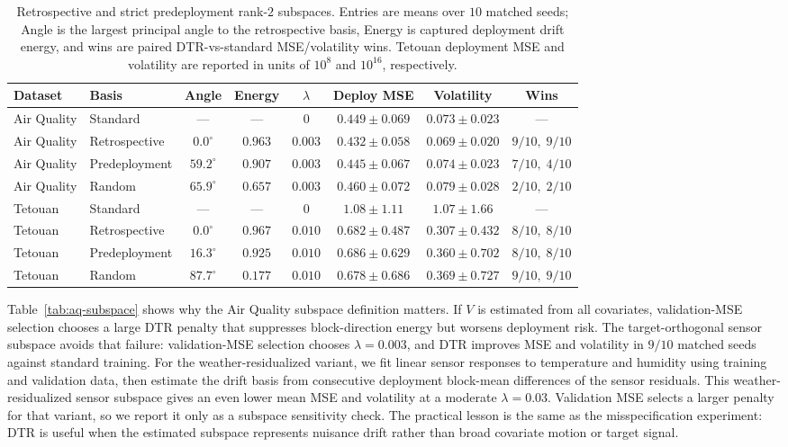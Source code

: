 \documentclass[conference]{IEEEtran}
\begin{document}
\begin{table}[t]
\caption{Retrospective and strict predeployment rank-$2$ subspaces. Entries are means over $10$ matched seeds; Angle is the largest principal angle to the retrospective basis, Energy is captured deployment drift energy, and wins are paired DTR-vs-standard MSE/volatility wins. Tetouan deployment MSE and volatility are reported in units of $10^8$ and $10^{16}$, respectively.}
\centering
\setlength{\tabcolsep}{4pt}
\footnotesize
\begin{tabular}{llcccccc}
\toprule
Dataset & Basis & Angle & Energy & $\lambda$ & Deploy MSE & Volatility & Wins \\
\midrule
Air Quality & Standard & --- & --- & $0$ & $0.449\pm0.069$ & $0.073\pm0.023$ & --- \\
Air Quality & Retrospective & $0.0^\circ$ & $0.963$ & $0.003$ & $0.432\pm0.058$ & $0.069\pm0.020$ & $9/10,\;9/10$ \\
Air Quality & Predeployment & $59.2^\circ$ & $0.907$ & $0.003$ & $0.445\pm0.067$ & $0.074\pm0.023$ & $7/10,\;4/10$ \\
Air Quality & Random & $65.9^\circ$ & $0.657$ & $0.003$ & $0.460\pm0.072$ & $0.079\pm0.028$ & $2/10,\;2/10$ \\
\addlinespace
Tetouan & Standard & --- & --- & $0$ & $1.08\pm1.11$ & $1.07\pm1.66$ & --- \\
Tetouan & Retrospective & $0.0^\circ$ & $0.967$ & $0.010$ & $0.682\pm0.487$ & $0.307\pm0.432$ & $8/10,\;8/10$ \\
Tetouan & Predeployment & $16.3^\circ$ & $0.925$ & $0.010$ & $0.686\pm0.629$ & $0.360\pm0.702$ & $8/10,\;8/10$ \\
Tetouan & Random & $87.7^\circ$ & $0.177$ & $0.010$ & $0.678\pm0.686$ & $0.369\pm0.727$ & $9/10,\;9/10$ \\
\bottomrule
\end{tabular}
\label{tab:prospective}
\end{table}

Table~\ref{tab:aq-subspace} shows why the Air Quality subspace definition matters. If $V$ is estimated from all covariates, validation-MSE selection chooses a large DTR penalty that suppresses block-direction energy but worsens deployment risk. The target-orthogonal sensor subspace avoids that failure: validation-MSE selection chooses $\lambda=0.003$, and DTR improves MSE and volatility in $9/10$ matched seeds against standard training. For the weather-residualized variant, we fit linear sensor responses to temperature and humidity using training and validation data, then estimate the drift basis from consecutive deployment block-mean differences of the sensor residuals. This weather-residualized sensor subspace gives an even lower mean MSE and volatility at a moderate $\lambda=0.03$. Validation MSE selects a larger penalty for that variant, so we report it only as a subspace sensitivity check. The practical lesson is the same as the misspecification experiment: DTR is useful when the estimated subspace represents nuisance drift rather than broad covariate motion or target signal.
\end{document}
